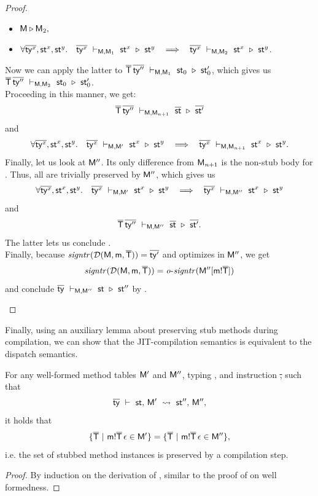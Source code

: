 {\begin{proof}
{\begin{itemize}
\begin{itemize}
        \item $\mathsf{M} \triangleright \mathsf{M}_2,$
        \item $\forall \ol{\ty^x}, \st^x, \st^y.\quad
          \eqst{\ol{\ty^x}}{\mtbl}{\mtbl_1}{\st^x}{\st^y} \ \ \implies\ \
          \eqst{\ol{\ty^x}}{\mtbl}{\mtbl_2}{\st^x}{\st^y}$.
      \end{itemize}
      Now we can apply the latter to
      $\overline{\mathsf{T}}\,\overline{\mathsf{ty}''}\ \vdash_{\mathsf{M},\mathsf{M}_1}\ \mathsf{st}_0\ \triangleright\ \mathsf{st}'_0$,
      which gives us $\overline{\mathsf{T}}\,\overline{\mathsf{ty}''}\ \vdash_{\mathsf{M},\mathsf{M}_2}\ \mathsf{st}_0\ \triangleright\ \mathsf{st}'_0$.\\
      Proceeding in this manner, we get:
      \[
        \overline{\mathsf{T}}\,\overline{\mathsf{ty}''}\ \vdash_{\mathsf{M},\mathsf{M}_{n+1}}\ \overline{\mathsf{st}}\ \triangleright\ \overline{\mathsf{st}'}
      \]
      and
      \[
        \forall \overline{\mathsf{ty}^x}, \mathsf{st}^x, \mathsf{st}^y.\quad
          \overline{\mathsf{ty}^x}\ \vdash_{\mathsf{M},\mathsf{M}'}\ \mathsf{st}^x\ \triangleright\ \mathsf{st}^y \ \ \implies\ \
          \overline{\mathsf{ty}^x}\ \vdash_{\mathsf{M},\mathsf{M}_{n+1}}\ \mathsf{st}^x\ \triangleright\ \mathsf{st}^y.
      \]
      Finally, let us look at $\mathsf{M}''$. Its only difference from $\mathsf{M}_{n+1}$
      is the non-stub body  for \msig\m{\ol\Ty}.
      Thus, all \eqst{\ol{\ty^x}}{\mtbl}{\mtbl_{n+1}}{\st^x}{\st^y}
      are trivially preserved by $\mathsf{M}''$, which gives us
      \[
        \forall \ol{\ty^x}, \st^x, \st^y.\quad
          \eqst{\ol{\ty^x}}{\mtbl}{\mtbl' }{\st^x}{\st^y} \ \ \implies\ \
          \eqst{\ol{\ty^x}}{\mtbl}{\mtbl''}{\st^x}{\st^y}
      \]
      and
      \[
        \overline{\mathsf{T}}\,\overline{\mathsf{ty}''}\ \vdash_{\mathsf{M},\mathsf{M}''}\ \overline{\mathsf{st}}\ \triangleright\ \overline{\mathsf{st}'}.
      \]
      The latter lets us conclude .\\
      Finally, because $\operatorname{\mathit{signtr}}(\operatorname{{\mathcal D}}(\mathsf{M},\mathsf{\mathsf{m}},{\overline{\mathsf{T}}})) = \overline{\mathsf{ty}'}$
      and \msig\m{\ol\Ty} optimizes \msig{} in $\mathsf{M}''$,
      we get \[\operatorname{\mathit{signtr}}(\operatorname{{\mathcal D}}(\mathsf{M},\mathsf{\mathsf{m}},{\overline{\mathsf{T}}})) =
      \operatorname{\mathit{o-signtr}}(\mathsf{M}''[{\mathsf{\mathsf{m}!{\overline{\mathsf{T}}}}}])\]
      and conclude $\overline{\mathsf{ty}}\ \vdash_{\mathsf{M},\mathsf{M}''}\ \mathsf{st}\ \triangleright\ \mathsf{st}''$ by .
  \end{itemize}
}
\end{proof}

Finally, using an auxiliary lemma about preserving stub methods
during compilation, we can show that the JIT-compilation semantics
is equivalent to the dispatch semantics.
\begin{lemma}[Preserving Stubs]\label{lem:comp-stubs}
  For any well-formed method tables $\mathsf{M}'$ and $\mathsf{M}''$, typing \ol\ty, and
  instruction \st, such that
  \[
    \overline{\mathsf{ty}}\ \vdash\ \mathsf{st},\, \mathsf{M}'\ \leadsto\ \mathsf{st}'',\, \mathsf{M}'',
  \]
  it holds that
  \[
    \{ \ol\Ty\ |\ \meth{\m}{\ol\Ty}{}{\done} \in \mtbl'  \} =
    \{ \ol\Ty\ |\ \meth{\m}{\ol\Ty}{}{\done} \in \mtbl'' \},
  \]
  i.e. the set of stubbed method instances is preserved by a compilation step.
\end{lemma}
\begin{proof}
  By induction on the derivation of
  ,
  similar to the proof of  on well formedness.
\end{proof}}
